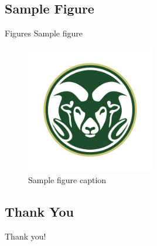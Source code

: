 \documentclass[usenames,dvipsnames]{beamer}
\begin{document}
\subsection{Sample Figure}
\begin{frame}{Figures}
  Sample figure

  \begin{figure}
    \centering
    \includegraphics[width=0.5\textwidth]{../Handwerk/figures/1.jpg}
    \caption{Sample figure caption}
    \label{fig:test_figure}
  \end{figure}
\end{frame}

\subsection{Thank You}
\begin{frame}[noframenumbering]{Thank you!}

\end{frame}
\end{document}
